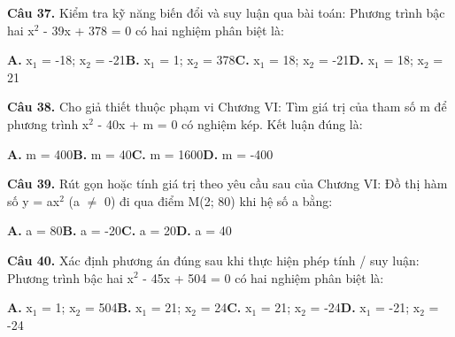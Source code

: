 \documentclass[11pt,a4paper]{article}
\begin{document}
\textbf{\color{primary} Câu 37.} Kiểm tra kỹ năng biến đổi và suy luận qua bài toán: Phương trình bậc hai x$^2$ - 39x + 378 = 0 có hai nghiệm phân biệt là:\par
\hspace*{1.5em}\textbf{A.} x$_1$ = -18; x$_2$ = -21\quad\quad \textbf{B.} x$_1$ = 1; x$_2$ = 378\quad\quad \textbf{C.} x$_1$ = 18; x$_2$ = -21\quad\quad \textbf{D.} x$_1$ = 18; x$_2$ = 21\par\vspace{2pt}
\textbf{\color{primary} Câu 38.} Cho giả thiết thuộc phạm vi Chương VI: Tìm giá trị của tham số m để phương trình x$^2$ - 40x + m = 0 có nghiệm kép. Kết luận đúng là:\par
\hspace*{1.5em}\textbf{A.} m = 400\quad\quad \textbf{B.} m = 40\quad\quad \textbf{C.} m = 1600\quad\quad \textbf{D.} m = -400\par\vspace{2pt}
\textbf{\color{primary} Câu 39.} Rút gọn hoặc tính giá trị theo yêu cầu sau của Chương VI: Đồ thị hàm số y = ax$^2$ (a $\ne$ 0) đi qua điểm M(2; 80) khi hệ số a bằng:\par
\hspace*{1.5em}\textbf{A.} a = 80\quad\quad \textbf{B.} a = -20\quad\quad \textbf{C.} a = 20\quad\quad \textbf{D.} a = 40\par\vspace{2pt}
\textbf{\color{primary} Câu 40.} Xác định phương án đúng sau khi thực hiện phép tính / suy luận: Phương trình bậc hai x$^2$ - 45x + 504 = 0 có hai nghiệm phân biệt là:\par
\hspace*{1.5em}\textbf{A.} x$_1$ = 1; x$_2$ = 504\quad\quad \textbf{B.} x$_1$ = 21; x$_2$ = 24\quad\quad \textbf{C.} x$_1$ = 21; x$_2$ = -24\quad\quad \textbf{D.} x$_1$ = -21; x$_2$ = -24\par\vspace{2pt}
\end{document}
